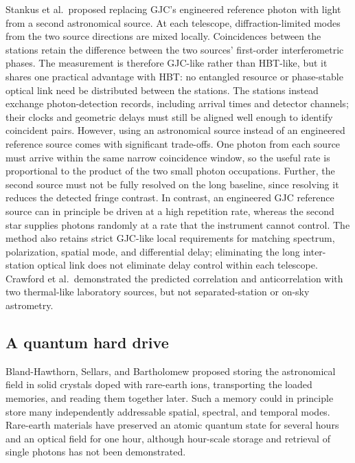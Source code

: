 \documentclass[]{spie}
\newcommand{\etal}{et al.}
\begin{document}
Stankus \etal\ proposed replacing GJC's engineered reference photon with light from a second astronomical source.\cite{Stankus2022} At each telescope, diffraction-limited modes from the two source directions are mixed locally. Coincidences between the stations retain the difference between the two sources' first-order interferometric phases. The measurement is therefore GJC-like rather than HBT-like, but it shares one practical advantage with HBT: no entangled resource or phase-stable optical link need be distributed between the stations. The stations instead exchange photon-detection records, including arrival times and detector channels; their clocks and geometric delays must still be aligned well enough to identify coincident pairs. However, using an astronomical source instead of an engineered reference source comes with significant trade-offs. One photon from each source must arrive within the same narrow coincidence window, so the useful rate is proportional to the product of the two small photon occupations. Further, the second source must not be fully resolved on the long baseline, since resolving it reduces the detected fringe contrast. In contrast, an engineered GJC reference source can in principle be driven at a high repetition rate, whereas the second star supplies photons randomly at a rate that the instrument cannot control. The method also retains strict GJC-like local requirements for matching spectrum, polarization, spatial mode, and differential delay; eliminating the long inter-station optical link does not eliminate delay control within each telescope. Crawford \etal\ demonstrated the predicted correlation and anticorrelation with two thermal-like laboratory sources, but not separated-station or on-sky astrometry.\cite{Crawford2023}

\WFclear
\subsection{A quantum hard drive}

Bland-Hawthorn, Sellars, and Bartholomew proposed storing the astronomical field in solid crystals doped with rare-earth ions, transporting the loaded memories, and reading them together later.\cite{BlandHawthorn2021} Such a memory could in principle store many independently addressable spatial, spectral, and temporal modes. Rare-earth materials have preserved an atomic quantum state for several hours and an optical field for one hour, although hour-scale storage and retrieval of single photons has not been demonstrated.\cite{Zhong2015,Ma2021}
\end{document}
